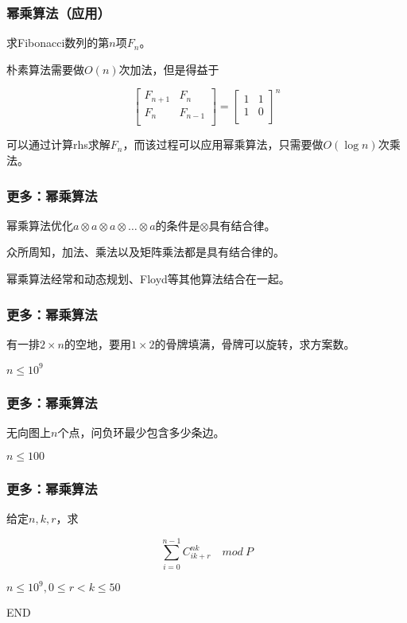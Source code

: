 \documentclass{ctexbeamer}
\begin{document}
    \begin{frame}
        \frametitle{幂乘算法（应用）}

        求Fibonacci数列的第$n$项$F_n$。

        朴素算法需要做$O(n)$次加法，但是得益于

        $$
        \begin{bmatrix}
            F_{n+1} & F_{n} \\
            F_{n} & F_{n-1} \\
        \end{bmatrix}
        =
        \begin{bmatrix}
            1 & 1 \\
            1 & 0 \\
        \end{bmatrix} ^ n
        $$

        可以通过计算rhs求解$F_n$，而该过程可以应用幂乘算法，只需要做$O(\log n)$次乘法。

    \end{frame}



    \begin{frame}
        \frametitle{更多：幂乘算法}

        幂乘算法优化$a\otimes a\otimes a\otimes \ldots \otimes a$的条件是$\otimes$具有结合律。
        
        众所周知，加法、乘法以及矩阵乘法都是具有结合律的。

        幂乘算法经常和动态规划、Floyd等其他算法结合在一起。

    \end{frame}

    \begin{frame}
        \frametitle{更多：幂乘算法}

        有一排$2\times n$的空地，要用$1\times 2$的骨牌填满，骨牌可以旋转，求方案数。

        $n\leq 10^9$

    \end{frame}

    \begin{frame}
        \frametitle{更多：幂乘算法}

        无向图上$n$个点，问负环最少包含多少条边。

        $n\leq 100$

    \end{frame}

    \begin{frame}
        \frametitle{更多：幂乘算法}

        给定$n,k,r$，求

        $$
        \sum_{i=0}^{n-1}{C_{ik+r}^{nk}} \quad mod \ P
        $$

        $n\leq 10^9,0\leq r < k \leq 50$

    \end{frame}

    \begin{frame}
        END
    \end{frame}
    
\end{document}
